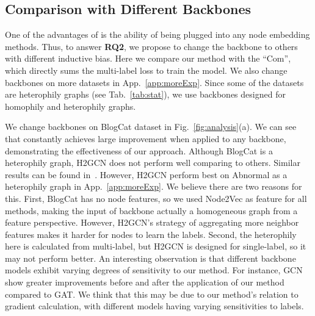 



\subsection{Comparison with Different Backbones}
One of the advantages of \model is the ability of being plugged into any node embedding methods. 
Thus, to answer \textbf{RQ2}, we propose to change the backbone to others with different inductive bias. Here we compare our method with the ``Com'', which directly sums the multi-label loss to train the model. We also change backbones on more datasets in App.~\ref{app:moreExp}. Since some of the datasets are heterophily graphs (see Tab.~\ref{tab:stat}), we use backbones designed for homophily and heterophily graphs.

We change backbones on BlogCat dataset in Fig.~\ref{fig:analysis}(a).
We can see that \model constantly achieves large improvement when applied to any backbone, demonstrating the effectiveness of our approach. 
Although BlogCat is a heterophily graph, H2GCN does not perform well comparing to others. Similar results can be found in~\citep{zhao2023multi}. However, H2GCN perform best on Abnormal as a heterophily graph in App.~\ref{app:moreExp}.
We believe there are two reasons for this. First, BlogCat has no node features, so we used Node2Vec as feature for all methods, making the input of backbone actually a homogeneous graph from a feature perspective. However, H2GCN’s strategy of aggregating more neighbor features makes it harder for nodes to learn the labels. 
Second, the heterophily here is calculated from multi-label, but H2GCN is designed for single-label, so it may not perform better.
An interesting observation is that different backbone models exhibit varying degrees of sensitivity to our method. For instance, GCN show greater improvements before and after the application of our method compared to GAT. We think that this may be due to our method's relation to gradient calculation, with different models having varying sensitivities to labels. 

